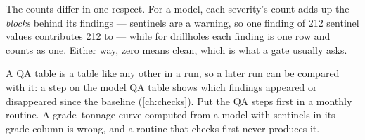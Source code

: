 The counts differ in one respect. For a model, each severity's count adds up the \emph{blocks} behind its findings — sentinels are a warning, so one finding of 212 sentinel values contributes 212 to  — while for drillholes each finding is one row and counts as one. Either way, zero means clean, which is what a gate usually asks.

A QA table is a table like any other in a run, so a later run can be compared with it: a  step on the model QA table shows which findings appeared or disappeared since the baseline (\cref{ch:checks}). Put the QA steps first in a monthly routine. A grade–tonnage curve computed from a model with sentinels in its grade column is wrong, and a routine that checks first never produces it.
